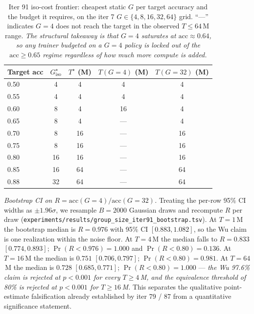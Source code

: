 \begin{table}[htbp]
\centering
\small
\begin{tabular}{lcccc}
\toprule
Target acc & $G^\star_\text{iso}$ & $T^\star$ (M) & $T(G{=}4)$ (M) & $T(G{=}32)$ (M) \\
\midrule
0.50 & 4 & 4 & 4 & 4 \\
0.55 & 4 & 4 & 4 & 4 \\
0.60 & 8 & 4 & 16 & 4 \\
0.65 & 8 & 4 & --- & 4 \\
0.70 & 8 & 16 & --- & 16 \\
0.75 & 8 & 16 & --- & 16 \\
0.80 & 16 & 16 & --- & 16 \\
0.85 & 16 & 64 & --- & 64 \\
0.88 & 32 & 64 & --- & 64 \\
\bottomrule
\end{tabular}
\caption{Iter 91 iso-cost frontier: cheapest static $G$ per
target accuracy and the budget it requires, on the iter 7
$G \in \{4,8,16,32,64\}$ grid. ``---'' indicates $G{=}4$ does not
reach the target in the observed $T \le 64$\,M range.
\emph{The structural takeaway is that $G{=}4$ saturates at
$\text{acc} \approx 0.64$, so any trainer budgeted on a
$G{=}4$ policy is locked out of the $\text{acc} \ge 0.65$
regime regardless of how much more compute is added.}}
\label{tab:iter91-isocost}
\end{table}

\emph{Bootstrap CI on $R = \text{acc}(G{=}4)/\text{acc}(G{=}32)$.}
Treating the per-row 95\% CI widths as $\pm 1.96\sigma$, we
resample $B{=}2000$ Gaussian draws and recompute $R$ per draw
(\texttt{experiments/results/group\_size\_iter91\_bootstrap.tsv}).
At $T{=}1$\,M the bootstrap median is $R{=}0.976$ with 95\% CI
$[0.883, 1.082]$, so the Wu claim is one realization within
the noise floor. At $T{=}4$\,M the median falls to $R{=}0.833$
$[0.774, 0.893]$; $\Pr(R < 0.976) = 1.000$ and
$\Pr(R < 0.80) = 0.136$. At $T{=}16$\,M the median is $0.751$
$[0.706, 0.797]$; $\Pr(R < 0.80) = 0.981$. At $T{=}64$\,M the
median is $0.728$ $[0.685, 0.771]$; $\Pr(R < 0.80) = 1.000$ ---
\emph{the Wu 97.6\% claim is rejected at $p < 0.001$ for every
$T \ge 4$\,M, and the equivalence threshold of 80\% is
rejected at $p < 0.001$ for $T \ge 16$\,M.} This separates the
qualitative point-estimate falsification already established by
iter 79 / 87 from a quantitative significance statement.

